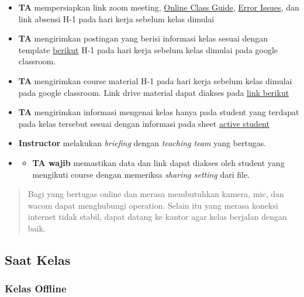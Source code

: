 \documentclass[
]{book}
\providecommand{\tightlist}{%
  \setlength{\itemsep}{0pt}\setlength{\parskip}{0pt}}
\begin{document}
\begin{itemize}
\item
  \textbf{TA} mempersiapkan link zoom meeting, \href{https://docs.google.com/document/d/16algZSEqLos2fksPcbmpUrpvvuVr62msVY13M8uPNos/edit?usp=sharing}{Online Class Guide}, \href{https://docs.google.com/document/d/1ZkhuxSTBjUqzbHeLsRbk8E4L1FFymWH0UmaI3xaomkg/edit?usp=sharing}{Error Issues}, dan link absensi H-1 pada hari kerja sebelum kelas dimulai
\item
  \textbf{TA} mengirimkan postingan yang berisi informasi kelas sesuai dengan template \href{https://docs.google.com/document/d/1leWbp3Eb2AwumFieuHiWStSNOXsKJQJD_h0tAhA2fLs/edit?usp=sharing}{berikut} H-1 pada hari kerja sebelum kelas dimulai pada google classroom.
\item
  \textbf{TA} mengirimkan course material H-1 pada hari kerja sebelum kelas dimulai pada google classroom. Link drive material dapat diakses pada \href{https://drive.google.com/drive/folders/1I1h0p4BkvkUYV8mtDU7bgswE_awOIxWY?usp=sharing}{link berikut}
\item
  \textbf{TA} mengirimkan informasi mengenai kelas hanya pada student yang terdapat pada kelas tersebut sesuai dengan informasi pada sheet \href{https://docs.google.com/spreadsheets/d/12FB9410fhRhZp9jl5qLe7x-LGw0QTSfLujA-dE867JE/edit?usp=sharing}{active student}
\item
  \textbf{Instructor} melakukan \emph{briefing} dengan \emph{teaching team} yang bertugas.
\item
  \begin{itemize}
  \tightlist
  \item
    \textbf{TA wajib} memastikan data dan link dapat diakses oleh student yang mengikuti course dengan memeriksa \emph{sharing setting} dari file.
  \end{itemize}
\end{itemize}

\begin{quote}
Bagi yang bertugas online dan merasa membutuhkan kamera, mic, dan wacom dapat menghubungi operation. Selain itu yang merasa koneksi internet tidak stabil, dapat datang ke kantor agar kelas berjalan dengan baik.
\end{quote}

\hypertarget{saat-kelas}{%
\subsection{Saat Kelas}\label{saat-kelas}}

\hypertarget{kelas-offline-1}{%
\subsubsection{Kelas Offline}\label{kelas-offline-1}}
\end{document}
